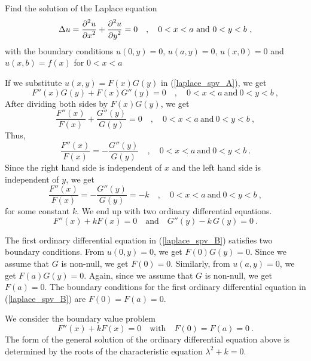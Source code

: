 \begin{egg}
Find the solution of the Laplace equation
\begin{equation} \label{laplace_spv_A}
\Delta u = \frac{\displaystyle \partial^{2}{u}} {\displaystyle \partial x^{2}} + \frac{\displaystyle \partial^{2}{u}} {\displaystyle \partial y^{2}} = 0 \quad ,
\quad 0 < x < a \ \text{and} \ 0 < y < b \ ,
\end{equation}
with the boundary conditions $u(0,y) = 0$, $u(a,y)=0$, $u(x,0)=0$
and $u(x,b) = f(x)$ for $0<x<a$

If we substitute $u(x,y) = F(x)G(y)$ in (\ref{laplace_spv_A}), we get
\[
F''(x)G(y) + F(x)G''(y) = 0 \quad , \quad  0 < x < a \ \text{and}
\ 0 < y < b \ ,
\]
After dividing both sides by $F(x)G(y)$, we get
\[
\frac{F''(x)}{F(x)} + \frac{G''(y)}{G(y)} = 0 \quad , \quad
 0 < x < a \ \text{and} \ 0 < y < b \ ,
\]
Thus,
\[
\frac{F''(x)}{F(x)} = - \frac{G''(y)}{G(y)} \quad , \quad
 0 < x < a \ \text{and} \ 0 < y < b \ .
\]
Since the right hand side is independent of $x$ and the left hand side
is independent of $y$, we get
\[
\frac{F''(x)}{F(x)} = - \frac{G''(y)}{G(y)} = -k \quad , \quad
 0 < x < a \ \text{and} \ 0 < y < b \ ,
\]
for some constant $k$.  We end up with two ordinary differential equations.
\begin{equation} \label{laplace_spv_B}
F''(x) + k F(x) = 0 \quad \text{and}
\quad G''(y) - k\,G(y) = 0 \ .
\end{equation}

The first ordinary differential equation in (\ref{laplace_spv_B})
satisfies two boundary conditions.   From $u(0,y) = 0$, we get
$F(0)G(y)=0$.  Since we assume that $G$ is non-null, we get
$F(0)=0$.  Similarly, from $u(a,y) = 0$, we get $F(a)G(y)=0$.  Again,
since we assume that $G$ is non-null, we get $F(a)=0$.  The
boundary conditions for the first ordinary differential equation in
(\ref{laplace_spv_B}) are $F(0)=F(a)=0$. 

We consider the boundary value problem
\begin{equation} \label{laplace_spv_C}
F''(x) + k F(x) = 0 \quad \text{with} \quad F(0)=F(a)=0  \ .
\end{equation}
The form of the general solution of the ordinary differential equation
above is determined by the roots of the characteristic equation
$\lambda^2+k=0$.


\end{egg}
